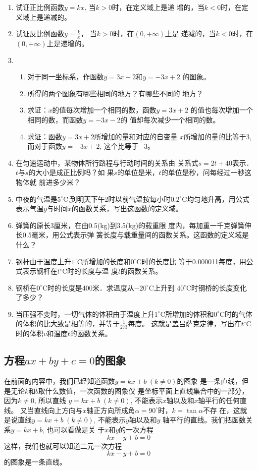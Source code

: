 \begin{enumerate}
\item 试证正比例函数$y=kx$, 当$k>0$时，在定义域上是递
增的，当$k<0$时，在定义域上是递减的。

\item 试证反比例函数$y=\frac{k}{x}$，
当$k>0$时，在$(0,+\infty)$上是
递减的，当$k<0$时，在$(0,+\infty)$上是递增的。
\item  \begin{enumerate}
    \item 对于同一坐标系，作函数$y=3x+2$和$y=-3x+2$
的图象。
\item 所得的两个图象有哪些相同的地方？有哪些不同的
地方？
\item 求证：$x$的值每次增加一个相同的数，函数$y=3x+2$
的值也每次增加一个相同的数，而函数$y=-3x-2$的
值却每次减少一个相同的数。
\item 求证：函数$y=3x+2$所增加的量和对应的自变量
$x$所增加的量的比等于3, 而对于函数$y=-3x+2$,
这个比等于$-3$。
\end{enumerate} 

\item 
在匀速运动中，某物体所行路程与行动时间的关系由
关系式$s=2t+40$表示．$t$与$s$的大小是成正比例吗？如
果$s$的单位是米，$t$的单位是秒，问每经过一秒这物体就
前进多少米？
\item 
中夜的气温是$5^{\circ}$C,到明天下午2时以前气温按每小时$0.2^{\circ}$C均匀地升高，用公式表示气温$y$与时间$x$的函数关系，写出这函数的定义域。

\item 弹簧的原长3厘米，在由0.5(kg)到3.5(kg)的载重限
度内，每加重一千克弹簧伸长0.5毫米，用公式表示弹
簧长度与载重量间的函数关系。这函数的定义域是什么？
\item 钢杆由于温度上升$1^{\circ}$C所增加的长度和$0^{\circ}$C时的长度比
等于0.000011每度，用公式表示钢杆在$t^{\circ}$C时的长度与温
度$t$的函数关系。
\item 钢桥在$0^{\circ}$C时的长度是400米．求温度从$-20^{\circ}$C上升到
$40^{\circ}$C时钢桥的长度变化了多少？
\item 当压强不变时，一切气体的体积由于温度上升$1^{\circ}$C所增加的体积和$0^{\circ}$C时的气体的体积的比大致是相等的，并等于$\frac{1}{273}$每度。
这就是盖吕萨克定律，写出在$t^{\circ}$C时的体积$v$和温度$t$的函数关系。

\end{enumerate}

\subsection{方程$ax+by+c=0$的图象}
在前面的内容中，我们已经知道函数$y=kx+b\; (k\ne 0)$的图象
是一条直线，但是无论$k$和$b$取什么数值，一次函数的图象仅
是坐标平面上直线集合中的一部分，因为$k\ne 0$, 所以直线
$y=kx+b\; (k\ne 0)$, 不能表示$x$轴以及和$x$轴平行的任何直线。
又当直线向上方向与$x$轴正方向所成角$\alpha=90^{\circ}$时，$k=\tan\alpha$不存
在，这就是说直线$y=kx+b\; (k\ne 0)$, 不能表示$y$轴以及和$y$
轴平行的直线。我们把函数关系$y=kx+b$, 也可以看做是关
于$x$和$y$的一次方程
\[kx-y+b=0\]
这样，我们也就可以知道二元一次方程
\[kx-y+b=0\]
的图象是一条直线。

